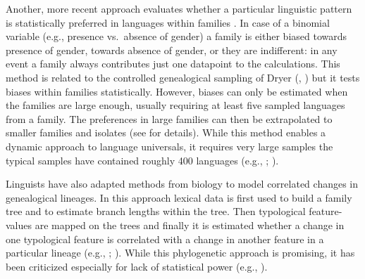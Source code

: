 \documentclass[output=collectionpaper]{langsci/langscibook}
\begin{document}
Another, more recent approach evaluates whether a particular linguistic pattern is statistically preferred in languages within families \citep{Bickel2013b}. In case of a binomial variable (e.g., presence vs.\ absence of gender) a family is either biased towards presence of gender, towards absence of gender, or they are indifferent: in any event a family always contributes just one datapoint to the calculations. This method is related to the controlled genealogical sampling of Dryer (\citealt*{Dryer1992}, \citealt*{Dryer2000}) but it tests biases within families statistically. However, biases can only be estimated when the families are large enough, usually requiring at least five sampled languages from a family. The preferences in large families can then be extrapolated to smaller families and isolates (see \citealt{Bickel2013b} for details). While this method enables a dynamic approach to language universals, it requires very large samples \textendash{} the typical samples have contained roughly 400 languages (e.g., \citealt{Bickel2013b}; \citealt{Bickel2014}).

Linguists have also adapted methods from biology to model correlated changes in genealogical lineages. In this approach lexical data is first used to build a family tree and to estimate branch lengths within the tree. Then typological feature-values are mapped on the trees and finally it is estimated whether a change in one typological feature is correlated with a change in another feature in a particular lineage (e.g., \citealt{Dunn2011}; \citealt{Levinson2011}). While this phylogenetic approach is promising, it has been criticized especially for lack of statistical power (e.g., \citealt{Cysouw2011}).
\end{document}
